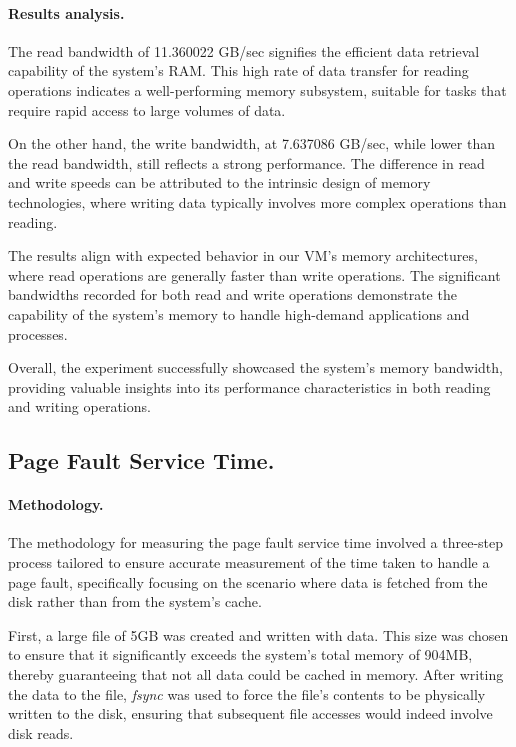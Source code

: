 \paragraph{Results analysis.}
The read bandwidth of 11.360022 GB/sec signifies the efficient data retrieval capability of the system's RAM. This high rate of data transfer for reading operations indicates a well-performing memory subsystem, suitable for tasks that require rapid access to large volumes of data.

On the other hand, the write bandwidth, at 7.637086 GB/sec, while lower than the read bandwidth, still reflects a strong performance. The difference in read and write speeds can be attributed to the intrinsic design of memory technologies, where writing data typically involves more complex operations than reading.

The results align with expected behavior in our VM's memory architectures, where read operations are generally faster than write operations. The significant bandwidths recorded for both read and write operations demonstrate the capability of the system's memory to handle high-demand applications and processes.

Overall, the experiment successfully showcased the system's memory bandwidth, providing valuable insights into its performance characteristics in both reading and writing operations.

\subsection{Page Fault Service Time.}
\paragraph{Methodology.}
The methodology for measuring the page fault service time involved a three-step process tailored to ensure accurate measurement of the time taken to handle a page fault, specifically focusing on the scenario where data is fetched from the disk rather than from the system's cache.

First, a large file of 5GB was created and written with data. This size was chosen to ensure that it significantly exceeds the system's total memory of 904MB, thereby guaranteeing that not all data could be cached in memory. After writing the data to the file, \emph{fsync} was used to force the file's contents to be physically written to the disk, ensuring that subsequent file accesses would indeed involve disk reads.

